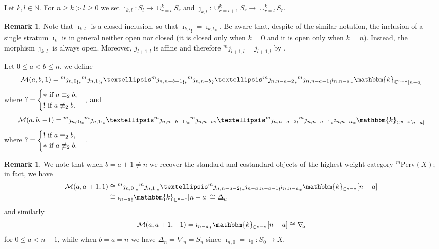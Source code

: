 \documentclass[11pt]{amsart}
\theoremstyle{definition}
\newtheorem{remark}[theorem]{Remark}
\newcommand{\C}{\mathbb{C}}
\newcommand{\kk}{\mathbbm{k}}
\newcommand{\cat}[1]{\mathrm{#1}}
\newcommand{\perv}[2]{{}^{#1}\cat{Perv}\!\left(#2\right)}
\newcommand{\pfun}[2]{{}^{#1}{#2}}
\newcommand{\stan}[2]{\pfun{#1}{\Delta_{#2}}}
\newcommand{\costan}[2]{\pfun{#1}{\nabla_{\! #2}}}
\begin{document}

Let $k,l\in\mathbb{N}$. For $n\geq k > l \geq 0$ we set $\imath_{k,l}\colon S_l\to \cup_{r=l}^k S_r$ and $\jmath_{k,l}\colon\cup_{r=l+1}^k S_r\to \cup_{r=l}^k S_r$. 

\begin{remark}
Note that $\imath_{k,l}$ is a closed inclusion, so that ${\imath_{k,l}}_!={\imath_{k,l}}_*$. Be aware that, despite of the similar notation, the inclusion of a single stratum $\imath_k$ is in general neither open nor closed (it is closed only when $k=0$ and it is open only when $k=n$). Instead, the morphism $\jmath_{k,l}$ is always open. Moreover, $j_{l+1,l}$ is affine and therefore $^m{j_{l+1,l}}=j_{l+1,l}$ by \cite[\S5.3]{DCM}.
\end{remark}

Let $0\leq a < b \leq n$, we define
\begin{equation}\label{thin_perverse1}
\mathcal{M}(a,b,1)={^m\jmath_{n,0}}_{!*}{^m\jmath_{n,1}}_{!*}\ldots{^m\jmath_{n,n-b-1}}_{!*}{^m\jmath_{n,n-b}}_?\ldots {^m\jmath_{n,n-a-2}}_*{^m\jmath_{n,n-a-1}}_!{\imath_{n,n-a}}_*\kk_{\mathbb{C}^{n-a}[n-a]}
\end{equation}
where $?=\begin{cases}
    * \ \hbox{if}\ a \equiv_2 b,\\ ! \ \hbox{if}\ a \not\equiv_2 b.
\end{cases}$, and 
\begin{equation}\label{thin_perverse2}
\mathcal{M}(a,b,-1)={^m\jmath_{n,0}}_{!*}{^m\jmath_{n,1}}_{!*}\ldots{^m\jmath_{n,n-b-1}}_{!*}{^m\jmath_{n,n-b}}_?\ldots {^m\jmath_{n,n-a-2}}_!{^m\jmath_{n,n-a-1}}_*{\imath_{n,n-a}}_*\kk_{\mathbb{C}^{n-a}[n-a]}
\end{equation}
where $?=\begin{cases}
    ! \ \hbox{if}\ a \equiv_2 b,\\ * \ \hbox{if}\ a \not\equiv_2 b.
\end{cases}$.

\begin{remark}
We note that when $b=a+1\neq n$ we recover the standard and costandard objects of the highest weight category $\perv{m}{X}$; in fact, we have 
\begin{equation*}
    \begin{split}
         \mathcal{M}(a,a+1,1) & \cong{{^m\jmath_{n,0}}_{!*}{^m\jmath_{n,1}}_{!*}\ldots{^m\jmath_{n,n-a-2}}_{!*}{\jmath_{n-a,n-a-1}}_! {\imath_{n,n-a}}_*\kk_{\C^{n-a}}[n-a] }\\ &\cong{\imath_{n-a}}_!\kk_{\C^{n-a}}[n-a]\cong\stan{}{a}
    \end{split}
\end{equation*}
and similarly
\[
\mathcal{M}(a,a+1,-1)={\imath_{n-a}}_*\kk_{\C^{n-a}}[n-a]\cong\costan{}{a}
\]
for $0\leq a< n-1$, while when $b=a=n$ we have $\stan{}{n}=\costan{}{n}=S_n$ since $\imath_{n,0}=\imath_0\colon S_0\to X$. 
\end{remark}
\end{document}

